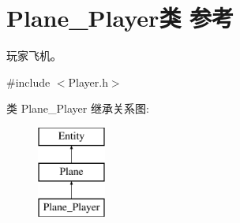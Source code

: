\hypertarget{class_plane___player}{}\section{Plane\+\_\+\+Player类 参考}
\label{class_plane___player}


玩家飞机。  




{\ttfamily \#include $<$Player.\+h$>$}

类 Plane\+\_\+\+Player 继承关系图\+:\begin{figure}[H]
\begin{center}
\leavevmode
\includegraphics[height=3.000000cm]{class_plane___player}
\end{center}
\end{figure}
